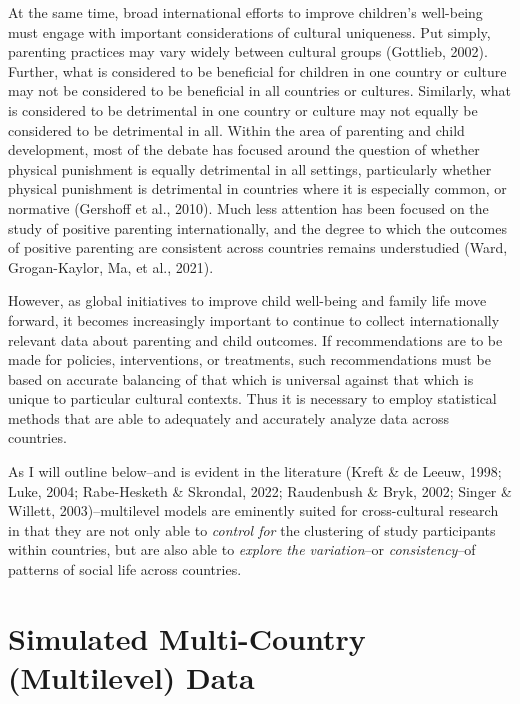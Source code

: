 \documentclass[
  letterpaper,
  DIV=11,
  numbers=noendperiod]{scrreprt}
\begin{document}
At the same time, broad international efforts to improve children's
well-being must engage with important considerations of cultural
uniqueness. Put simply, parenting practices may vary widely between
cultural groups (Gottlieb, 2002). Further, what is considered to be
beneficial for children in one country or culture may not be considered
to be beneficial in all countries or cultures. Similarly, what is
considered to be detrimental in one country or culture may not equally
be considered to be detrimental in all. Within the area of parenting and
child development, most of the debate has focused around the question of
whether physical punishment is equally detrimental in all settings,
particularly whether physical punishment is detrimental in countries
where it is especially common, or normative (Gershoff et al., 2010).
Much less attention has been focused on the study of positive parenting
internationally, and the degree to which the outcomes of positive
parenting are consistent across countries remains understudied (Ward,
Grogan-Kaylor, Ma, et al., 2021).

However, as global initiatives to improve child well-being and family
life move forward, it becomes increasingly important to continue to
collect internationally relevant data about parenting and child
outcomes. If recommendations are to be made for policies, interventions,
or treatments, such recommendations must be based on accurate balancing
of that which is universal against that which is unique to particular
cultural contexts. Thus it is necessary to employ statistical methods
that are able to adequately and accurately analyze data across
countries.

As I will outline below--and is evident in the literature (Kreft \& de
Leeuw, 1998; Luke, 2004; Rabe-Hesketh \& Skrondal, 2022; Raudenbush \&
Bryk, 2002; Singer \& Willett, 2003)--multilevel models are eminently
suited for cross-cultural research in that they are not only able to
\emph{control for} the clustering of study participants within
countries, but are also able to \emph{explore the variation}--or
\emph{consistency}--of patterns of social life across countries.


\hypertarget{sec-simulateddata}{%
\chapter{Simulated Multi-Country (Multilevel)
Data}\label{sec-simulateddata}}
\end{document}
